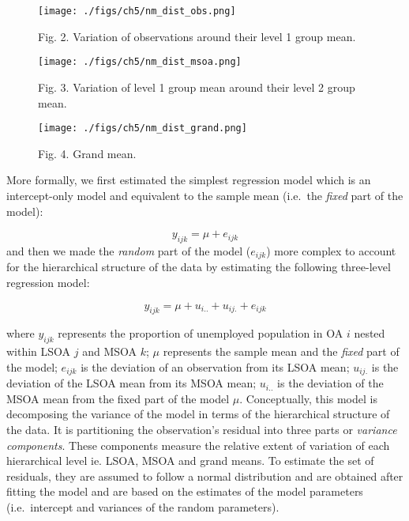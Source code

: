 \documentclass[
  letterpaper,
  krantz2]{style/krantz}
\begin{document}
\begin{figure}

{\centering \texttt{[image: ./figs/ch5/nm\_dist\_obs.png]}

}

\caption{Fig. 2. Variation of observations around their level 1 group
mean.}

\end{figure}

\begin{figure}

{\centering \texttt{[image: ./figs/ch5/nm\_dist\_msoa.png]}

}

\caption{Fig. 3. Variation of level 1 group mean around their level 2
group mean.}

\end{figure}

\begin{figure}

{\centering \texttt{[image: ./figs/ch5/nm\_dist\_grand.png]}

}

\caption{Fig. 4. Grand mean.}

\end{figure}

More formally, we first estimated the simplest regression model which is
an intercept-only model and equivalent to the sample mean (i.e.~the
\emph{fixed} part of the model):

\[y_{ijk} = \mu + e_{ijk}\] and then we made the \emph{random} part of
the model (\(e_{ijk}\)) more complex to account for the hierarchical
structure of the data by estimating the following three-level regression
model:

\[y_{ijk} = \mu + u_{i..} + u_{ij.} + e_{ijk}\]

where \(y_{ijk}\) represents the proportion of unemployed population in
OA \(i\) nested within LSOA \(j\) and MSOA \(k\); \(\mu\) represents the
sample mean and the \emph{fixed} part of the model; \(e_{ijk}\) is the
deviation of an observation from its LSOA mean; \(u_{ij.}\) is the
deviation of the LSOA mean from its MSOA mean; \(u_{i..}\) is the
deviation of the MSOA mean from the fixed part of the model \(\mu\).
Conceptually, this model is decomposing the variance of the model in
terms of the hierarchical structure of the data. It is partitioning the
observation's residual into three parts or \emph{variance components}.
These components measure the relative extent of variation of each
hierarchical level ie. LSOA, MSOA and grand means. To estimate the set
of residuals, they are assumed to follow a normal distribution and are
obtained after fitting the model and are based on the estimates of the
model parameters (i.e.~intercept and variances of the random
parameters).
\end{document}
